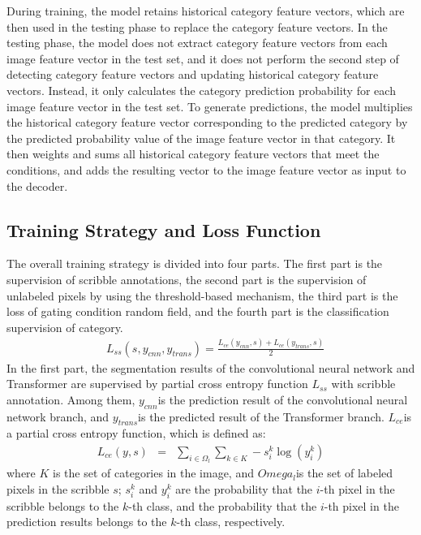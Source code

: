\documentclass[sigconf,natbib=false]{acmart}
\begin{document}
During training, the model retains historical category feature vectors, which are then used in the testing phase to replace the category feature vectors. In the testing phase, the model does not extract category feature vectors from each image feature vector in the test set, and it does not perform the second step of detecting category feature vectors and updating historical category feature vectors. Instead, it only calculates the category prediction probability for each image feature vector in the test set.
To generate predictions, the model multiplies the historical category feature vector corresponding to the predicted category by the predicted probability value of the image feature vector in that category. It then weights and sums all historical category feature vectors that meet the conditions, and adds the resulting vector to the image feature vector as input to the decoder.
\vspace{-2mm}
\subsection{Training Strategy and Loss Function}
The overall training strategy is divided into four parts. The first part is the supervision of scribble annotations, the second part is the supervision of unlabeled pixels by using the threshold-based mechanism, the third part is the loss of gating condition random field, and the fourth part is the classification supervision of category.
\begin{eqnarray}
&L_{ss}\left(s, y_{c n n}, y_{trans}\right)=\frac{L_{c e}\left(y_{c n n}, s\right)+ L_{c e}\left(y_{trans}, s\right)}{2}
\label{eq:Lss}
\end{eqnarray}
In the first part, the segmentation results of the convolutional neural network and Transformer are supervised by partial cross entropy function $L_{ss}$ with scribble annotation. Among them, $y_{cnn}$is the prediction result of the convolutional neural network branch, and $y_{trans}$is the predicted result of the Transformer branch. $L_{ce}$is a partial cross entropy function, which is defined as:
\begin{eqnarray}
L_{ce}(y, s) & = & \sum_{i \in \Omega_{l}} \sum_{k \in K}-s_{i}^{k} \log \left(y_{i}^{k}\right)
\label{eq:Lce}
\end{eqnarray}
where $K$ is the set of categories in the image, and $Omega_{l}$is the set of labeled pixels in the scribble $s$; $s_i^k$ and $y_i^k$ are the probability that the $i$-th pixel in the scribble belongs to the $k$-th class, and the probability that the $i$-th pixel in the prediction results belongs to the $k$-th class, respectively.
\end{document}
